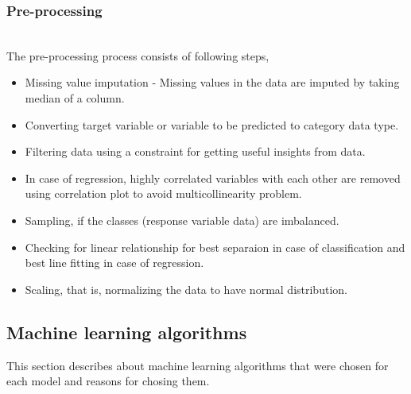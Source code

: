\documentclass[format=sigconf]{acmart}
\begin{document}
\subsubsection{Pre-processing}
\hfill\\
The pre-processing process consists of following steps,
\begin{itemize}
    \item Missing value imputation - Missing values in the data are imputed by taking median of a column.
    \item Converting target variable or variable to be predicted to category data type.
    \item Filtering data using a constraint for getting useful insights from data.
    \item In case of regression, highly correlated variables with each other are removed using correlation plot to avoid multicollinearity problem. 
    \item Sampling, if the classes (response variable data) are imbalanced.
    \item Checking for linear relationship for best separaion in case of classification and best line fitting in case of regression.
    \item Scaling, that is, normalizing the data to have normal distribution.
\end{itemize}
\subsection{Machine learning algorithms}
This section describes about machine learning algorithms that were chosen for each model and reasons for chosing them.
\end{document}
